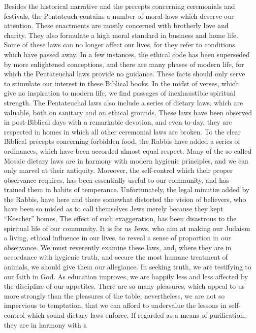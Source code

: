 Besides the historical narrative and the
precepts concerning ceremonials and festivals,
the Pentateuch contains a number of moral
laws which deserve our attention. These
enactments are mostly concerned with
brotherly love and charity. They also
formulate a high moral standard in business
and home life. Some of these laws can no
longer affect our lives, for they refer to
conditions which have passed away. In a
few instances, the ethical code has been
superseded by more enlightened conceptions,
and there are many phases of modern life, for
which the Pentateuchal laws provide no
guidance. These facts should only serve to
stimulate our interest in these Biblical books.
In the midst of verses, which give no inspiration
to modern life, we find passages of
inexhaustible spiritual strength. The Pentateuchal
laws also include a series of dietary
laws, which are valuable, both on sanitary
and on ethical grounds. These laws have
been observed in post-Biblical days with
a remarkable devotion, and even to-day,
they are respected in homes in which all
other ceremonial laws are broken. To
the clear Biblical precepts concerning forbidden
food, the Rabbis have added a
series of ordinances, which have been
accorded almost equal respect. Many of
the so-called Mosaic dietary laws are in
harmony with modern hygienic principles,
and we can only marvel at their antiquity.
Moreover, the self-control which their proper
observance requires, has been essentially
useful to our community, and has trained
them in habits of temperance. Unfortunately,
the legal minutiæ added by the Rabbis,
have here and there somewhat distorted the
vision of believers, who have been so
misled as to call themselves Jews merely
because they kept “Koscher” homes. The
effect of such exaggeration, has been
disastrous to the spiritual life of our
community. It is for us Jews, who aim at
making our Judaism a living, ethical influence
in our lives, to reveal a sense of proportion
in our observance. We must
reverently examine these laws, and, where
they are in accordance with hygienic truth,
and secure the most humane treatment
of animals, we should give them our
allegiance. In seeking truth, we are testifying
to our faith in God. As education
improves, we are happily less and less
affected by the discipline of our appetites.
There are so many pleasures, which appeal
to us more strongly than the pleasures of the
table; nevertheless, we are not so impervious
to temptation, that we can afford to undervalue
the lessons in self-control which sound
dietary laws enforce. If regarded as a means
of purification, they are in harmony with a
